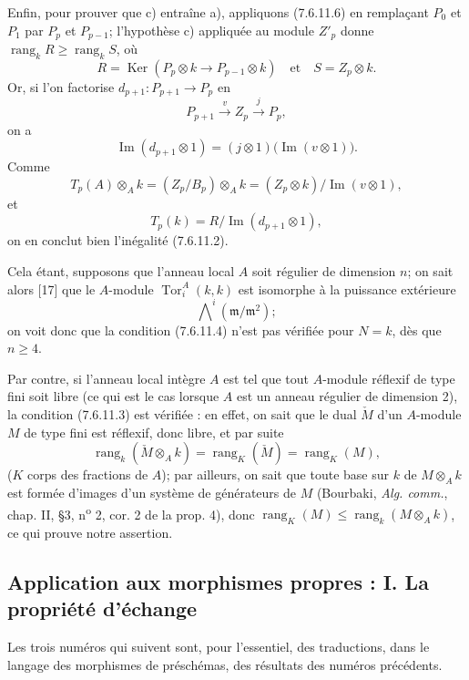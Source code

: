 \begin{remark}[7.6.11]
Enfin, pour prouver que c) entraîne a), appliquons (7.6.11.6) en remplaçant
$P_0$ et $P_1$ par $P_p$ et $P_{p-1}$; l'hypothèse c) appliquée au module
$Z'_p$ donne $\operatorname{rang}_kR\geq\operatorname{rang}_kS$, où
\[
  R=\operatorname{Ker}(P_p\otimes k\longrightarrow P_{p-1}\otimes k)
  \quad\text{et}\quad
  S=Z_p\otimes k.
\]
Or, si l'on factorise $d_{p+1}:P_{p+1}\to P_p$ en
\[
  P_{p+1}\xrightarrow{v}Z_p\xrightarrow{j}P_p,
\]
on a
\[
  \operatorname{Im}(d_{p+1}\otimes1)
  =
  (j\otimes1)\bigl(\operatorname{Im}(v\otimes1)\bigr).
\]
Comme
\[
  T_p(A)\otimes_A k
  =(Z_p/B_p)\otimes_A k
  =(Z_p\otimes k)/\operatorname{Im}(v\otimes1),
\]
et
\[
  T_p(k)=R/\operatorname{Im}(d_{p+1}\otimes1),
\]
on en conclut bien l'inégalité (7.6.11.2).

Cela étant, supposons que l'anneau local $A$ soit régulier de dimension $n$;
on sait alors [17] que le $A$-module
$\operatorname{Tor}_i^A(k,k)$ est isomorphe à la puissance extérieure
\[
  \bigwedge\nolimits^i(\mathfrak m/\mathfrak m^2);
\]
on voit donc que la condition (7.6.11.4) n'est pas vérifiée pour $N=k$, dès que
$n\geq4$.

Par contre, si l'anneau local intègre $A$ est tel que tout $A$-module réflexif
de type fini soit libre (ce qui est le cas lorsque $A$ est un anneau régulier
de dimension 2), la condition (7.6.11.3) est vérifiée : en effet, on sait que le
dual $\check M$ d'un $A$-module $M$ de type fini est réflexif, donc libre, et
par suite
\[
  \operatorname{rang}_k(\check M\otimes_A k)
  =
  \operatorname{rang}_K(\check M)
  =
  \operatorname{rang}_K(M),
\]
($K$ corps des fractions de $A$); par ailleurs, on sait que toute base sur $k$
de $M\otimes_A k$ est formée d'images d'un système de générateurs de $M$
(Bourbaki, \emph{Alg. comm.}, chap. II, \S 3, n\textsuperscript{o} 2, cor. 2 de
la prop. 4), donc
$\operatorname{rang}_K(M)\leq\operatorname{rang}_k(M\otimes_A k)$, ce qui
prouve notre assertion.
\end{remark}

\subsection{Application aux morphismes propres : I. La propriété d'échange}
\label{subsection:III.7.7.fr}

Les trois numéros qui suivent sont, pour l'essentiel, des traductions, dans le
langage des morphismes de préschémas, des résultats des numéros précédents.

